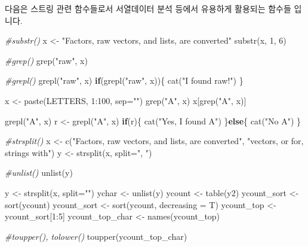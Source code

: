 \documentclass[
]{book}
\newenvironment{Shaded}{\begin{snugshade}}{\end{snugshade}}
\newcommand{\AttributeTok}[1]{\textcolor[rgb]{0.77,0.63,0.00}{#1}}
\newcommand{\CommentTok}[1]{\textcolor[rgb]{0.56,0.35,0.01}{\textit{#1}}}
\newcommand{\ControlFlowTok}[1]{\textcolor[rgb]{0.13,0.29,0.53}{\textbf{#1}}}
\newcommand{\DecValTok}[1]{\textcolor[rgb]{0.00,0.00,0.81}{#1}}
\newcommand{\FunctionTok}[1]{\textcolor[rgb]{0.00,0.00,0.00}{#1}}
\newcommand{\NormalTok}[1]{#1}
\newcommand{\OtherTok}[1]{\textcolor[rgb]{0.56,0.35,0.01}{#1}}
\newcommand{\SpecialCharTok}[1]{\textcolor[rgb]{0.00,0.00,0.00}{#1}}
\newcommand{\StringTok}[1]{\textcolor[rgb]{0.31,0.60,0.02}{#1}}
\begin{document}
다음은 스트링 관련 함수들로서 서열데이터 분석 등에서 유용하게 활용되는 함수들 입니다.

\begin{Shaded}
\begin{Highlighting}[]
\CommentTok{\#substr()}
\NormalTok{x }\OtherTok{\textless{}{-}} \StringTok{"Factors, raw vectors, and lists, are converted"}
\FunctionTok{substr}\NormalTok{(x, }\DecValTok{1}\NormalTok{, }\DecValTok{6}\NormalTok{)}

\CommentTok{\#grep()}
\FunctionTok{grep}\NormalTok{(}\StringTok{"raw"}\NormalTok{, x)}

\CommentTok{\#grepl()}
\FunctionTok{grepl}\NormalTok{(}\StringTok{"raw"}\NormalTok{, x)}
\ControlFlowTok{if}\NormalTok{(}\FunctionTok{grepl}\NormalTok{(}\StringTok{"raw"}\NormalTok{, x))\{}
  \FunctionTok{cat}\NormalTok{(}\StringTok{"I found raw!"}\NormalTok{)}
\NormalTok{\}}

\NormalTok{x }\OtherTok{\textless{}{-}} \FunctionTok{paste}\NormalTok{(LETTERS, }\DecValTok{1}\SpecialCharTok{:}\DecValTok{100}\NormalTok{, }\AttributeTok{sep=}\StringTok{""}\NormalTok{)}
\FunctionTok{grep}\NormalTok{(}\StringTok{"A"}\NormalTok{, x)}
\NormalTok{x[}\FunctionTok{grep}\NormalTok{(}\StringTok{"A"}\NormalTok{, x)]}

\FunctionTok{grepl}\NormalTok{(}\StringTok{"A"}\NormalTok{, x)}
\NormalTok{r }\OtherTok{\textless{}{-}} \FunctionTok{grepl}\NormalTok{(}\StringTok{"A"}\NormalTok{, x)}
\ControlFlowTok{if}\NormalTok{(r)\{}
  \FunctionTok{cat}\NormalTok{(}\StringTok{"Yes, I found A"}\NormalTok{)}
\NormalTok{\}}\ControlFlowTok{else}\NormalTok{\{}
  \FunctionTok{cat}\NormalTok{(}\StringTok{"No A"}\NormalTok{)}
\NormalTok{\}}

\CommentTok{\#strsplit()}
\NormalTok{x }\OtherTok{\textless{}{-}} \FunctionTok{c}\NormalTok{(}\StringTok{"Factors, raw vectors, and lists, are converted"}\NormalTok{, }\StringTok{"vectors, or for, strings with"}\NormalTok{)}
\NormalTok{y }\OtherTok{\textless{}{-}} \FunctionTok{strsplit}\NormalTok{(x, }\AttributeTok{split=}\StringTok{", "}\NormalTok{)}

\CommentTok{\#unlist()}
\FunctionTok{unlist}\NormalTok{(y)}

\NormalTok{y }\OtherTok{\textless{}{-}} \FunctionTok{strsplit}\NormalTok{(x, }\AttributeTok{split=}\StringTok{""}\NormalTok{)}
\NormalTok{ychar }\OtherTok{\textless{}{-}} \FunctionTok{unlist}\NormalTok{(y)}
\NormalTok{ycount }\OtherTok{\textless{}{-}} \FunctionTok{table}\NormalTok{(y2)}
\NormalTok{ycount\_sort }\OtherTok{\textless{}{-}} \FunctionTok{sort}\NormalTok{(ycount)}
\NormalTok{ycount\_sort }\OtherTok{\textless{}{-}} \FunctionTok{sort}\NormalTok{(ycount, }\AttributeTok{decreasing =}\NormalTok{ T)}
\NormalTok{ycount\_top }\OtherTok{\textless{}{-}}\NormalTok{ ycount\_sort[}\DecValTok{1}\SpecialCharTok{:}\DecValTok{5}\NormalTok{]}
\NormalTok{ycount\_top\_char }\OtherTok{\textless{}{-}} \FunctionTok{names}\NormalTok{(ycount\_top)}

\CommentTok{\#toupper(), tolower()}
\FunctionTok{toupper}\NormalTok{(ycount\_top\_char)}
\end{Highlighting}
\end{Shaded}
\end{document}
